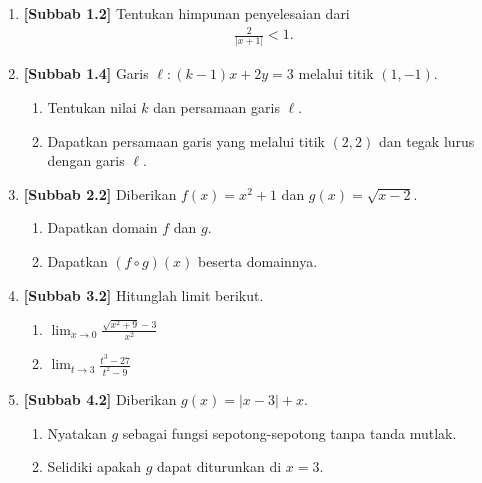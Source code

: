 \documentclass[10pt,openany,a4paper]{article}
\theoremstyle{definition}
\theoremstyle{definition}
\theoremstyle{plain}
\begin{document}
\begin{enumerate}
    \item \textbf{[Subbab 1.2]} Tentukan himpunan penyelesaian dari
    \begin{align*}
        \frac{2}{|x+1|}<1.
    \end{align*}

    \item \textbf{[Subbab 1.4]} Garis $\ell: (k-1)x+2y=3$ melalui titik $(1,-1)$.
    \begin{enumerate}
        \item Tentukan nilai $k$ dan persamaan garis $\ell$.
        \item Dapatkan persamaan garis yang melalui titik $(2,2)$ dan tegak lurus dengan garis $\ell$.
    \end{enumerate}

    \item \textbf{[Subbab 2.2]} Diberikan $f(x)=x^2+1$ dan $g(x)=\sqrt{x-2}$.
    \begin{enumerate}
        \item Dapatkan domain $f$ dan $g$.
        \item Dapatkan $(f\circ g)(x)$ beserta domainnya.
    \end{enumerate}

    \item \textbf{[Subbab 3.2]} Hitunglah limit berikut.
    \begin{enumerate}
        \item $\displaystyle\lim_{x\to 0}\frac{\sqrt{x^2+9}-3}{x^2}$
        \item $\displaystyle\lim_{t\to 3}\frac{t^3-27}{t^2-9}$
    \end{enumerate}

    \item \textbf{[Subbab 4.2]} Diberikan $g(x)=|x-3|+x$.
    \begin{enumerate}
        \item Nyatakan $g$ sebagai fungsi sepotong-sepotong tanpa tanda mutlak.
        \item Selidiki apakah $g$ dapat diturunkan di $x=3$.
    \end{enumerate}
\end{enumerate}
\end{document}
